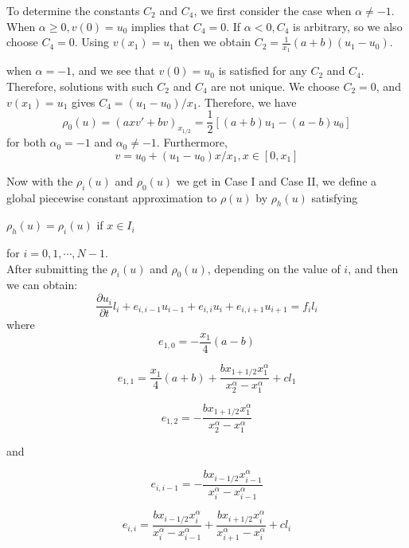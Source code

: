 \documentclass{article}
\begin{document}
To determine the constants $C_2$ and $C_4$, we first consider the case when $\alpha \neq -1$. When $\alpha \geq 0 , v(0) = u_0 $ implies that $C_4 = 0$. If $\alpha< 0, C_4$ is arbitrary, so we also choose $C_4 = 0$. Using $v(x_1) = u_1$ then we obtain $C_2 = \frac{1}{x_1}(a + b)(u_1 - u_0)$.

when $\alpha = -1$, and we see that $v(0) = u_0$ is satisfied for any $C_2$ and $C_4$. Therefore, solutions with such $C_2$ and $C_4$ are not unique. We choose $C_2 = 0$, and $v(x_1) = u_1$ gives $C_4 = (u_1 - u_0)/x_1$. Therefore, we have
$$
\rho_0(u) = (axv'+bv)_{x_{1/2}} = \frac{1}{2}[(a+b)u_1 - (a - b)u_0]
$$
for both $\alpha_0 = -1$ and $\alpha_0 \neq -1$. Furthermore,
$$
v = u_0 + (u_1 - u_0)x/x_1, x \in [0,x_1]
$$

Now with the $\rho_i(u)$ and $\rho_0(u)$ we get in Case I and Case II, we define a global piecewise constant approximation to $\rho(u)$ by $\rho_h(u)$ satisfying 
\begin{center}
$\rho_h(u) = \rho_i(u)$ if $x \in I_i$
\end{center}
for $i = 0,1, \cdots, N-1$.\\

After submitting the $\rho_i(u)$ and $\rho_0(u)$, depending on the value of $i$, and then we can obtain:
$$
\frac{\partial u_i}{\partial t}l_i + e_{i,i-1}u_{i-1} + e_{i,i}u_i +e_{i,i+1}u_{i+1} = f_il_i
$$
where
\begin{equation}
e_{1,0} = -\frac{x_1}{4}(a-b)
\end{equation}

\begin{equation}
e_{1,1} = \frac{x_1}{4}(a+b) + \frac{bx_{1+1/2}x_1^{\alpha}}{x_2^{\alpha}-x_1^{\alpha}} + c l_1
\end{equation}

\begin{equation}
e_{1,2} = - \frac{bx_{1+1/2}x_1^{\alpha}}{x_2^{\alpha}-x_1^{\alpha}}
\end{equation}

and 

\begin{equation}
e_{i,i-1} = - \frac{bx_{i-1/2}x_{i-1}^{\alpha}}{x_{i}^{\alpha}-x_{i-1}^{\alpha}}
\end{equation}

\begin{equation}
e_{i,i} =  \frac{b x_{i-1/2}x_{i}^{\alpha}}{x_{i}^{\alpha}-x_{i-1}^{\alpha}} + \frac{b x_{i+1/2}x_{i}^{\alpha}}{x_{i+1}^{\alpha}-x_{i}^{\alpha}} + cl_i
\end{equation}
\end{document}
